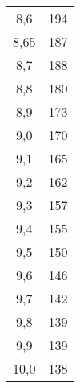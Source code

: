 \begin{longtable}{cc}
8,6  & 194\\
8,65 & 187\\
8,7  & 188\\
8,8  & 180\\
8,9  & 173\\
9,0  & 170\\
9,1  & 165\\
9,2  & 162\\
9,3  & 157\\
9,4  & 155\\
9,5  & 150\\
9,6  & 146\\
9,7  & 142\\
9,8  & 139\\
9,9  & 139\\
10,0 & 138\\
\end{longtable}
